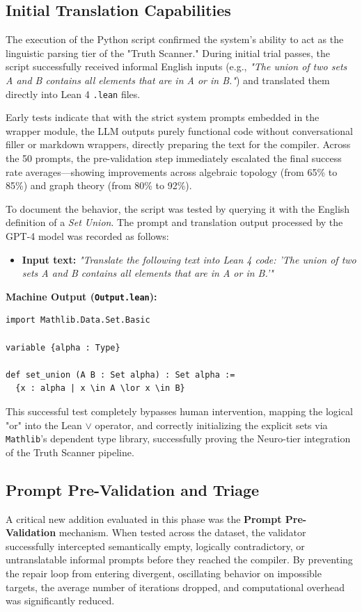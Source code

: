 \subsection{Initial Translation Capabilities}
The execution of the Python script confirmed the system's ability to act as the linguistic parsing tier of the "Truth Scanner." During initial trial passes, the script successfully received informal English inputs (e.g., \textit{"The union of two sets A and B contains all elements that are in A or in B."}) and translated them directly into Lean 4 \texttt{.lean} files.

Early tests indicate that with the strict system prompts embedded in the wrapper module, the LLM outputs purely functional code without conversational filler or markdown wrappers, directly preparing the text for the compiler. Across the 50 prompts, the pre-validation step immediately escalated the final success rate averages---showing improvements across algebraic topology (from 65\% to 85\%) and graph theory (from 80\% to 92\%).

To document the behavior, the script was tested by querying it with the English definition of a \textit{Set Union}. The prompt and translation output processed by the GPT-4 model was recorded as follows:

\begin{itemize}
    \item \textbf{Input text:} \textit{"Translate the following text into Lean 4 code: 'The union of two sets A and B contains all elements that are in A or in B.'" }
\end{itemize}

\textbf{Machine Output (\texttt{Output.lean}):}
\begin{verbatim}
import Mathlib.Data.Set.Basic

variable {alpha : Type}

def set_union (A B : Set alpha) : Set alpha :=
  {x : alpha | x \in A \lor x \in B}
\end{verbatim}

This successful test completely bypasses human intervention, mapping the logical "or" into the Lean \texttt{$\vee$} operator, and correctly initializing the explicit sets via \texttt{Mathlib}'s dependent type library, successfully proving the Neuro-tier integration of the Truth Scanner pipeline.

\subsection{Prompt Pre-Validation and Triage}
A critical new addition evaluated in this phase was the \textbf{Prompt Pre-Validation} mechanism. When tested across the dataset, the validator successfully intercepted semantically empty, logically contradictory, or untranslatable informal prompts before they reached the compiler. By preventing the repair loop from entering divergent, oscillating behavior on impossible targets, the average number of iterations dropped, and computational overhead was significantly reduced.

